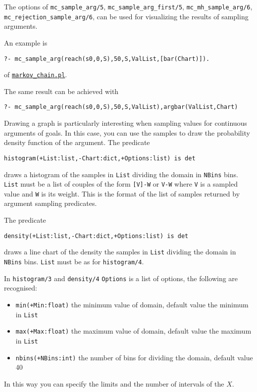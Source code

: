 The options of
\verb|mc_sample_arg/5|, \verb|mc_sample_arg_first/5|,   \verb|mc_mh_sample_arg/6|,  \verb|mc_rejection_sample_arg/6|, 
can be used for visualizing the results of sampling arguments.

An example is
\begin{verbatim}
?- mc_sample_arg(reach(s0,0,S),50,S,ValList,[bar(Chart)]).
\end{verbatim}
of \href{http://cplint.eu/example/inference/markov_chain.pl}{\texttt{markov\_chain.pl}}.

The same result can be achieved with
\begin{verbatim}
?- mc_sample_arg(reach(s0,0,S),50,S,ValList),argbar(ValList,Chart)
\end{verbatim}
Drawing a graph is particularly interesting when
sampling values for continuous arguments of goals.
In this case, you can use the samples to draw the
probability density function of the argument.
The predicate
\begin{verbatim}
histogram(+List:list,-Chart:dict,+Options:list) is det
\end{verbatim}
draws a histogram of the samples in \verb|List| dividing the domain in
 \verb|NBins| bins.
\verb|List| must be a list of couples of the form \verb|[V]-W| or  \verb|V-W|
where \verb|V| is a sampled value and \verb|W| is its weight. This is the format of the list of samples returned by argument sampling predicates.

The predicate
\begin{verbatim}
density(+List:list,-Chart:dict,+Options:list) is det
\end{verbatim}
draws a line chart of the density the samples in \verb|List| dividing the domain in
 \verb|NBins| bins.
\verb|List| must be as for \verb|histogram/4|.

In  \verb|histogram/3| and  \verb|density/4| \verb|Options| is a list of options, the following are recognised: \begin{itemize}
\item \verb|min(+Min:float)|
the minimum value of domain, default value the minimum in \verb|List|
\item \verb|max(+Max:float)|
the maximum value of domain, default value the maximum in  \verb|List|
\item \verb|nbins(+NBins:int)|
  the number of bins for dividing the domain, default value 40
\end{itemize}
In this way you can specify the limits and the number of intervals of the $X$.


